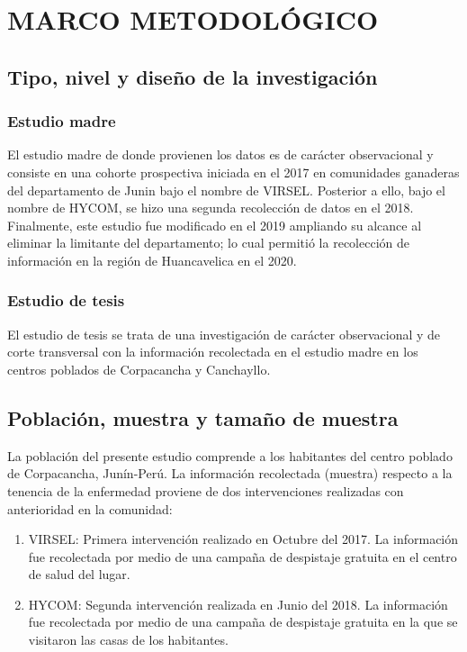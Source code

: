 \chapter{MARCO METODOLÓGICO}

\section{Tipo, nivel y diseño de la investigación}
\subsection*{Estudio madre}
El estudio madre de donde provienen los datos es de carácter observacional y consiste en una cohorte prospectiva iniciada en el 2017 en comunidades ganaderas del departamento de Junin bajo el nombre de VIRSEL. Posterior a ello, bajo el nombre de HYCOM, se hizo una segunda recolección de datos en el 2018. Finalmente, este estudio fue modificado en el 2019 ampliando su alcance al eliminar la limitante del departamento; lo cual permitió la recolección de información en la región de Huancavelica en el 2020.

\subsection*{Estudio de tesis}
El estudio de tesis se trata de una investigación de carácter observacional y de corte transversal con la información recolectada en el estudio madre en los centros poblados de Corpacancha y Canchayllo.

\section{Población, muestra y tamaño de muestra}
La población del presente estudio comprende a los habitantes del centro poblado de Corpacancha, Junín-Perú. La información recolectada (muestra) respecto a la tenencia de la enfermedad proviene de dos intervenciones realizadas con anterioridad en la comunidad:
\begin{enumerate}
	\item VIRSEL: Primera intervención realizado en Octubre del 2017. La información fue recolectada por medio de una campaña de despistaje gratuita en el centro de salud del lugar.
	\item HYCOM: Segunda intervención realizada en Junio del 2018. La información fue recolectada por medio de una campaña de despistaje gratuita en la que se visitaron las casas de los habitantes.
\end{enumerate}

